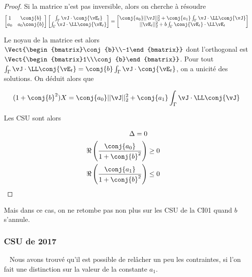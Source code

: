\begin{proof}
        Si la matrice n'est pas inversible, alors on cherche à résoudre
        \[
          \begin{bmatrix}
            1 & \conj{b} \\
            a_0 & a_0\conj{b}
          \end{bmatrix}
          \begin{bmatrix}
            \int_\Gamma \vJ \cdot \conj{\vE_t} \\
            \int_\Gamma \vJ \cdot \LL\conj{\vE_t}
          \end{bmatrix}
          =
          \begin{bmatrix}
            \conj{a_0}||\vJ||_2^2 + \conj{a_1}\int_\Gamma \vJ \cdot \LL\conj{\vJ} \\
            ||\vE_t||_2^2 + b\int_\Gamma \conj{\vE_t} \cdot \LL\vE_t
          \end{bmatrix}
        \]

        Le noyau de la matrice est alors \(\Vect{\begin{bmatrix}\conj{b}\\-1\end{bmatrix}}\) dont l'orthogonal est  \(\Vect{\begin{bmatrix}1\\\conj{b}\end{bmatrix}}\).
        Pour tout \(\int_\Gamma \vJ\cdot \LL\conj{\vE_t} = \conj{b} \int_\Gamma \vJ \cdot \conj{\vE_t} \), on a unicité des solutions. On déduit alors que

        \[
          (1 + \conj{b}^2) X = \conj{a_0} ||\vJ||_2^2 + \conj{a_1}\int_\Gamma \vJ \cdot \LL\conj{\vJ}
        \]

        Les CSU sont alors

        \begin{align}
          \Delta = 0 \\
          \Re\left(\frac{\conj{a_0}}{1 + \conj{b}^2}\right) &\ge 0 \\
          \Re\left(\frac{\conj{a_1}}{1 + \conj{b}^2}\right) &\le 0
        \end{align}

      \end{proof}

      Mais dans ce cas, on ne retombe pas non plus sur les CSU de la CI01 quand \(b\) s'annule.

    \subsubsection{CSU de 2017}
      ~
      Nous avons trouvé qu'il est possible de relâcher un peu les contraintes, si l'on fait une distinction sur la valeur de la constante \(a_1\).
